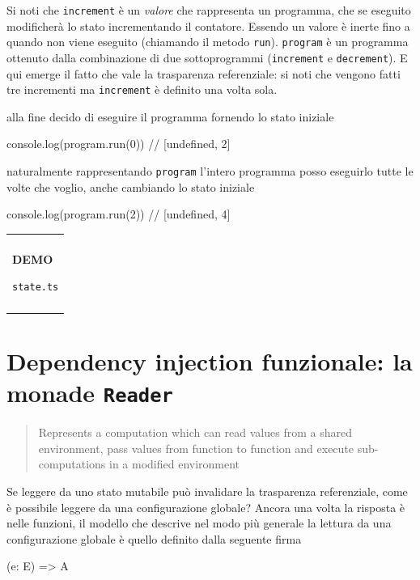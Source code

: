 \documentclass[12pt]{article}
\theoremstyle{definition}
\newenvironment{demo}
    {\begin{center}
    \begin{tabular}{|p{0.9\textwidth}|}
    \hline\\
    }
    {
    \\\\\hline
    \end{tabular}
    \end{center}
    }
\newenvironment{code}
  {\vspace{0.5cm} \VerbatimEnvironment\begin{typescriptcode}}
  {\end{typescriptcode} \vspace{0.2cm}}
\begin{document}
Si noti che \texttt{increment} è un \emph{valore} che rappresenta un programma, che se eseguito
modificherà lo stato incrementando il contatore.
Essendo un valore è inerte fino a quando non viene eseguito (chiamando il metodo \texttt{run}).
\texttt{program} è un programma ottenuto dalla combinazione di due sottoprogrammi (\texttt{increment} e \texttt{decrement}).
E qui emerge il fatto che vale la trasparenza referenziale: si noti che vengono fatti tre incrementi
ma \texttt{increment} è definito una volta sola.

alla fine decido di eseguire il programma fornendo lo stato iniziale

\begin{code}
console.log(program.run(0)) // [undefined, 2]
\end{code}

naturalmente rappresentando \texttt{program} l'intero programma posso eseguirlo tutte le volte che voglio,
anche cambiando lo stato iniziale

\begin{code}
console.log(program.run(2)) // [undefined, 4]
\end{code}

\begin{demo}
\begin{center}
\textbf{DEMO}

\texttt{state.ts}
\end{center}
\end{demo}

\newpage

\section{Dependency injection funzionale: la monade \texttt{Reader}}

\begin{quote}
Represents a computation which can read values from a shared environment, pass values from function to function
and execute sub-computations in a modified environment
\end{quote}

Se leggere da uno stato mutabile può invalidare la trasparenza referenziale, come è possibile leggere da una configurazione globale?
Ancora una volta la risposta è nelle funzioni, il modello che descrive nel modo più generale la lettura da una configurazione globale
è quello definito dalla seguente firma

\begin{code}
(e: E) => A
\end{code}
\end{document}
